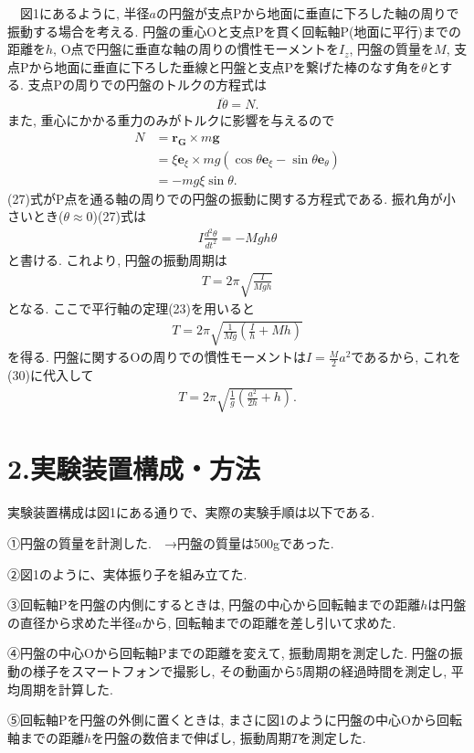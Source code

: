 \documentclass{jlreq}
\begin{document}
　図1にあるように, 半径$a$の円盤が支点Pから地面に垂直に下ろした軸の周りで振動する場合を考える. 円盤の重心Oと支点Pを貫く回転軸P(地面に平行)までの距離を$h$, O点で円盤に垂直な軸の周りの慣性モーメントを$I_z$, 円盤の質量を$M$, 支点Pから地面に垂直に下ろした垂線と円盤と支点Pを繋げた棒のなす角を$\theta$とする. 支点Pの周りでの円盤のトルクの方程式は
\begin{align}
    I \ddot{\theta} = N.
\end{align}
また, 重心にかかる重力のみがトルクに影響を与えるので
\begin{align}
    N &= \bm{r_G} \times m\bm{g}\\
      &= \xi \bm{e}_{\xi} \times mg(\cos \theta \bm{e}_{\xi} - \sin \theta \bm{e}_{\theta})\\
      &= -mg \xi \sin \theta.
\end{align}
(27)式がP点を通る軸の周りでの円盤の振動に関する方程式である. 振れ角が小さいとき($\theta \approx 0$)(27)式は
\begin{align}
    I \frac{d^2 \theta}{d t^2} = -Mgh\theta
\end{align}
と書ける. これより, 円盤の振動周期は
\begin{align}
    T = 2\pi \sqrt{\frac{I}{Mgh}}
\end{align}
となる. ここで平行軸の定理(23)を用いると
\begin{align}
    T = 2\pi \sqrt{\frac{1}{Mg}(\frac{I}{h} + Mh)}
\end{align}
を得る. 円盤に関するOの周りでの慣性モーメントは$I = \frac{M}{2}a^2$であるから, これを(30)に代入して
\begin{align}
    T = 2\pi \sqrt{\frac{1}{g} (\frac{a^2}{2h} + h)}.
\end{align}





\section*{2.実験装置構成・方法}
実験装置構成は図1にある通りで、実際の実験手順は以下である.

①円盤の質量を計測した.　→円盤の質量は500gであった.\par
②図1のように、実体振り子を組み立てた.\par
③回転軸Pを円盤の内側にするときは, 円盤の中心から回転軸までの距離$h$は円盤の直径から求めた半径$a$から, 回転軸までの距離を差し引いて求めた. \par
④円盤の中心Oから回転軸Pまでの距離を変えて, 振動周期を測定した. 円盤の振動の様子をスマートフォンで撮影し, その動画から5周期の経過時間を測定し, 平均周期を計算した. \par
⑤回転軸Pを円盤の外側に置くときは, まさに図1のように円盤の中心Oから回転軸までの距離$h$を円盤の数倍まで伸ばし, 振動周期$T$を測定した. 
\end{document}
